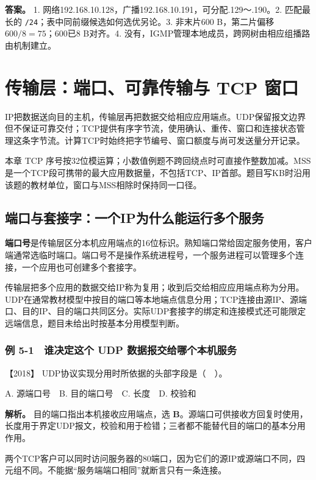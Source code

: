 \textbf{答案。} 1. 网络192.168.10.128，广播192.168.10.191，可分配.129～.190。2. 匹配最长的 \texttt{/24}；表中同前缀候选如何选优另论。3. 非末片600 B，第二片偏移 \(600/8=75\)；600已8 B对齐。4. 没有，IGMP管理本地成员，跨网树由相应组播路由机制建立。

\chapter{传输层：端口、可靠传输与 TCP 窗口}\label{cn-ch5}

IP把数据送向目的主机，传输层再把数据交给相应应用端点。UDP保留报文边界但不保证可靠交付；TCP提供有序字节流，使用确认、重传、窗口和连接状态管理这条字节流。计算TCP时始终把字节编号、窗口额度与尚可发送量分开记录。

本章 TCP 序号按32位模运算；小数值例题不跨回绕点时可直接作整数加减。MSS是一个TCP段可携带的最大应用数据量，不包括TCP、IP首部。题目写KB时沿用该题的教材单位，窗口与MSS相除时保持同一口径。

\section{端口与套接字：一个IP为什么能运行多个服务}\label{cn-05-01}

\textbf{端口号}是传输层区分本机应用端点的16位标识。熟知端口常给固定服务使用，客户端通常选临时端口。端口号不是操作系统进程号，一个服务进程可以管理多个连接，一个应用也可创建多个套接字。

传输层把多个应用的数据交给IP称为复用；收到后交给相应应用端点称为分用。UDP在通常教材模型中按目的端口等本地端点信息分用；TCP连接由源IP、源端口、目的IP、目的端口共同区分。实际UDP套接字的绑定和连接模式还可能限定远端信息，题目未给出时按基本分用模型判断。

\subsection{例 5-1　谁决定这个 UDP 数据报交给哪个本机服务}\label{cn-ex5-1}

\noindent{}【2018】 UDP协议实现分用时所依据的头部字段是（　）。

A. 源端口号　B. 目的端口号　C. 长度　D. 校验和


\textbf{解析。} 目的端口指出本机接收应用端点，选 \textbf{B}。源端口可供接收方回复时使用，长度用于界定UDP报文，校验和用于检错；三者都不能替代目的端口的基本分用作用。

两个TCP客户可以同时访问服务器的80端口，因为它们的源IP或源端口不同，四元组不同。不能据``服务端端口相同''就断言只有一条连接。

